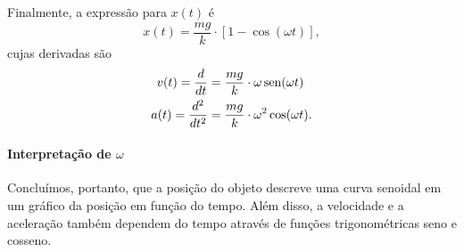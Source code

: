\begin{marginfigure}
\centering
{}
\caption{Gráfico da posição (linha contínua), velocidade (linha tracejada), e aceleração (linha pontilhada) como funções do tempo para um sistema massa-mola. (As escalas dos eixos verticais das três funções são diferentes para que os três gráficos possam ser comparados qualitativamente.)}
\end{marginfigure}

Finalmente, a expressão para $x(t)$ é
\begin{equation}
	x(t) = \frac{mg}{k} \cdot [1 - \cos(\omega t)],
\end{equation}
%
cujas derivadas são
\begin{align}
	v(t) = \frac{d}{dt} &= \frac{mg}{k} \cdot \omega\operatorname{sen}(\omega t)\\
	a(t) = \frac{d^2}{dt^2} &= \frac{mg}{k} \cdot \omega^2\cos(\omega t).
\end{align}

\paragraph{Interpretação de $\omega$}

Concluímos, portanto, que a posição do objeto descreve uma curva senoidal em um gráfico da posição em função do tempo. Além disso, a velocidade e a aceleração também dependem do tempo através de funções trigonométricas seno e cosseno.
\begin{marginfigure}
\centering
{}
\caption{O tempo necessário para completarmos uma oscilação é o que denominamos como período $T$. Como a periodicidade da função seno é igual a $2\pi$, quando $\omega t = 2\pi$, o movimento se repete e o valor de $t$ é o do próprio período $T$.}
\end{marginfigure}

